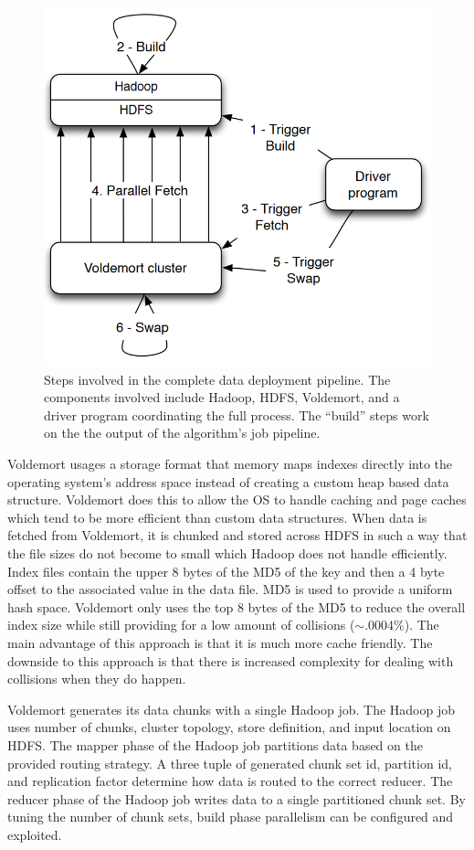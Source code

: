 \documentclass[]{article}
\begin{document}
\begin{figure}
    \centering
    \includegraphics[width=0.7\linewidth]{img/voldemort}
    \caption[Voldemort data deployment pipeline.]{Steps involved in the complete data deployment pipeline. The components involved include Hadoop, HDFS, Voldemort, and a driver program coordinating the full process. The ``build'' steps work on the the output of the algorithm's job pipeline. \cite{Sumbaly:2012:SLB:2208461.2208479}}
    \label{fig:voldemort}
\end{figure}

Voldemort usages a storage format that memory maps indexes directly into the operating system's address space instead of creating a custom heap based data structure. Voldemort does this to allow the OS to handle caching and page caches which tend to be more efficient than custom data structures. When data is fetched from Voldemort, it is chunked and stored across HDFS in such a way that the file sizes do not become to small which Hadoop does not handle efficiently. Index files contain the upper 8 bytes of the MD5 of the key and then a 4 byte offset to the associated value in the data file. MD5 is used to provide a uniform hash space. Voldemort only uses the top 8 bytes of the MD5 to reduce the overall index size while still providing for a low amount of collisions ($\sim$.0004\%). The main advantage of this approach is that it is much more cache friendly. The downside to this approach is that there is increased complexity for dealing with collisions when they do happen.

Voldemort generates its data chunks with a single Hadoop job. The Hadoop job uses number of chunks, cluster topology, store definition, and input location on HDFS. The mapper phase of the Hadoop job partitions data based on the provided routing strategy. A three tuple of generated chunk set id, partition id, and replication factor determine how data is routed to the correct reducer. The reducer phase of the Hadoop job writes data to a single partitioned chunk set. By tuning the number of chunk sets, build phase parallelism can be configured and exploited.
\end{document}

